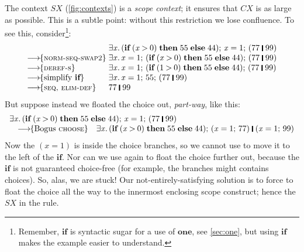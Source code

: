 \documentclass[acmsmall,review,anonymous,dvipsnames]{acmart}
\newcommand{\Conid}[1]{\mathit{#1}}
\newcommand{\Varid}[1]{\mathit{#1}}
\begin{document}
The context \ensuremath{\Conid{SX}} (\cref{fig:contexts}) is a \emph{scope context}; it
ensures that \ensuremath{CX} is as large as possible.  This is a subtle point:
without this restriction we lose confluence.  To see this, consider\footnote{Remember, \ensuremath{\textbf{if}} is syntactic sugar for
  a use of \ensuremath{\textbf{one}}, see \cref{sec:one}, but using \ensuremath{\textbf{if}} makes the example easier to understand.}:
$$
\begin{array}{l@{\;}l}
                                 & \ensuremath{\exists\Varid{x}.\,(\textbf{if}\;(\Varid{x}\mathbin{>}\mathrm{0})\;\textbf{then}\;\mathrm{55}\;\textbf{else}\;\mathrm{44});\,\Varid{x}\mathrel{=}\mathrm{1};\,(\mathrm{77}\;\rule[-0.3mm]{0.5mm}{2.5mm}\;\mathrm{99})}\\
 \movestoR{norm-seq-swap2}       & \ensuremath{\exists\Varid{x}.\,\Varid{x}\mathrel{=}\mathrm{1};\,(\textbf{if}\;(\Varid{x}\mathbin{>}\mathrm{0})\;\textbf{then}\;\mathrm{55}\;\textbf{else}\;\mathrm{44});\,(\mathrm{77}\;\rule[-0.3mm]{0.5mm}{2.5mm}\;\mathrm{99})}\\
 \movestoR{deref-s}                & \ensuremath{\exists\Varid{x}.\,\Varid{x}\mathrel{=}\mathrm{1};\,(\textbf{if}\;(\mathrm{1}\mathbin{>}\mathrm{0})\;\textbf{then}\;\mathrm{55}\;\textbf{else}\;\mathrm{44});\,(\mathrm{77}\;\rule[-0.3mm]{0.5mm}{2.5mm}\;\mathrm{99})}\\
 \movestoC{\text{simplify \ensuremath{\textbf{if}}}} & \ensuremath{\exists\Varid{x}.\,\Varid{x}\mathrel{=}\mathrm{1};\,\mathrm{55};\,(\mathrm{77}\;\rule[-0.3mm]{0.5mm}{2.5mm}\;\mathrm{99})}\\
 \movestoR{seq, elim-def}       & \ensuremath{\mathrm{77}\;\rule[-0.3mm]{0.5mm}{2.5mm}\;\mathrm{99}}\\
\end{array}
$$
But suppose instead we floated the choice out, \emph{part-way}, like this:
$$
\begin{array}{ll}
\multicolumn{2}{l}{\ensuremath{\exists\Varid{x}.\,(\textbf{if}\;(\Varid{x}\mathbin{>}\mathrm{0})\;\textbf{then}\;\mathrm{55}\;\textbf{else}\;\mathrm{44});\,\Varid{x}\mathrel{=}\mathrm{1};\,(\mathrm{77}\;\rule[-0.3mm]{0.5mm}{2.5mm}\;\mathrm{99})}}\\
\quad \movestoC{\text{Bogus \rulename{choose}}} & \ensuremath{\exists\Varid{x}.\,(\textbf{if}\;(\Varid{x}\mathbin{>}\mathrm{0})\;\textbf{then}\;\mathrm{55}\;\textbf{else}\;\mathrm{44});\,(\Varid{x}\mathrel{=}\mathrm{1};\,\mathrm{77})\;\rule[-0.3mm]{0.5mm}{2.5mm}\;(\Varid{x}\mathrel{=}\mathrm{1};\,\mathrm{99})}\\
\end{array}
$$
Now the \ensuremath{(\Varid{x}\mathrel{=}\mathrm{1})} is inside the choice branches, so we cannot use  to
move it to the left of the \ensuremath{\textbf{if}}.
Nor can we use  again to float the choice further out,
because the \ensuremath{\textbf{if}} is not guaranteed choice-free (for example, the branches might contains choices).
So, alas, we are stuck!
Our not-entirely-satisfying solution is to force  to float the choice all the way
to the innermost enclosing scope construct; hence the \ensuremath{\Conid{SX}} in the rule.
\end{document}
